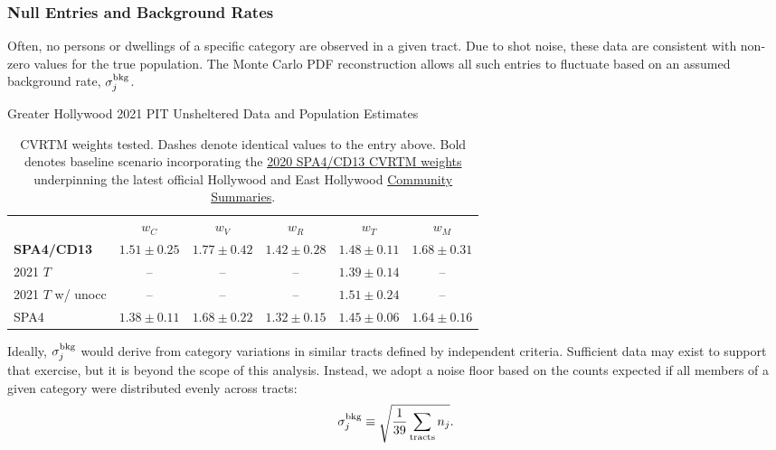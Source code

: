 \documentclass[11pt,twocolumn]{article}
\begin{document}
\subsubsection{Null Entries and Background Rates}
\label{sec:nulls}

Often, no persons or dwellings of a specific category are observed in a given tract. Due to shot 
noise, these data are consistent with non-zero values for the true population. The Monte Carlo 
PDF reconstruction allows all such entries to fluctuate based on an assumed background rate,
$\sigma_{j}^{\rm bkg}$. 

\begin{table}[t]
\centering
\caption{Greater Hollywood 2021 PIT Unsheltered Data and Population Estimates}
\begin{tabular}{lccccc}
\toprule
 & $w_{C}$ & $w_{V}$ & $w_{R}$ & $w_{T}$ & $w_{M}$ \\ \cmidrule{1-6}
{\bf SPA4/CD13} & $1.51\pm0.25$ & $1.77\pm0.42$ & $1.42\pm0.28$ & $1.48\pm0.11$ & $1.68\pm0.31$ \\
2021 $T$ & -- & -- & -- & $1.39\pm0.14$ & --\\
2021 $T$ w/ unocc & -- & -- & --& $1.51\pm0.24$ & --\\
SPA4 & $1.38\pm0.11$ & $1.68\pm0.22$ & $1.32\pm0.15$ & $1.45\pm0.06$ & $1.64\pm0.16$\\
\bottomrule
\end{tabular}
\caption*{CVRTM weights tested. Dashes denote identical values to the entry above. Bold denotes 
baseline scenario incorporating the 
\href{https://www.lahsa.org/documents?id=4635-usc-2018-2020-multipliers-and-estimates-overview}
{2020 SPA4/CD13 CVRTM weights} underpinning the latest official Hollywood and East Hollywood 
\href{https://www.lahsa.org/documents?id=4686-2020-greater-los-angeles-city-community-homelessness-report-service-planning-area-4.pdf}{Community Summaries}.}
\label{tbl:weights}
\end{table}

Ideally, $\sigma_{j}^{\rm bkg}$ would derive from category variations in similar tracts defined 
by independent criteria. Sufficient data may exist to support that exercise, but it is beyond the scope 
of this analysis. Instead, we adopt a noise floor based on the counts expected if all members of a given 
category were distributed evenly across tracts:
\begin{equation}
	\sigma_{j}^{\rm bkg} \equiv \sqrt{\frac{1}{39}\sum_{\rm tracts}n_{j}}.
\end{equation}
\end{document}
